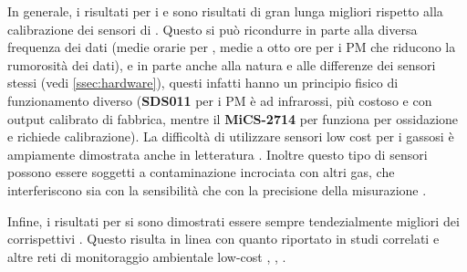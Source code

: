 In generale, i risultati per i  e  sono risultati di gran lunga migliori rispetto alla calibrazione dei sensori di . Questo si può ricondurre in parte alla diversa frequenza dei dati (medie orarie per , medie a otto ore per i PM che riducono la rumorosità dei dati), e in parte anche alla natura e alle differenze dei sensori stessi (vedi \ref{ssec:hardware}), questi infatti hanno un principio fisico di funzionamento diverso (\textbf{SDS011} per i PM è ad infrarossi, più costoso e con output calibrato di fabbrica, mentre il \textbf{MiCS-2714} per  funziona per ossidazione e richiede calibrazione). La difficoltà di utilizzare sensori low cost per i gassosi è ampiamente dimostrata anche in letteratura \cite{low_cost_gas_sensors}. Inoltre questo tipo di sensori possono essere soggetti a contaminazione incrociata con altri gas, che interferiscono sia con la sensibilità che con la precisione della misurazione \cite{cross_contamination}.

Infine, i risultati per  si sono dimostrati essere sempre tendezialmente migliori dei corrispettivi . Questo risulta in linea con quanto riportato in studi correlati \cite{s18092843} e altre reti di monitoraggio ambientale low-cost \cite{eval_zikova}, \cite{s17081805}, \cite{s17081922}.
